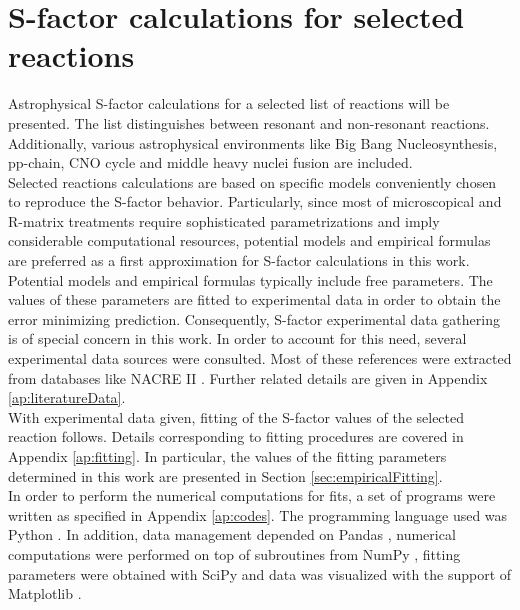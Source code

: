 \documentclass[openany]{book}
\begin{document}
\chapter{S-factor calculations for selected reactions} \label{ch:sfactorCalculations}

Astrophysical S-factor calculations for a selected list of reactions will be presented. The list distinguishes between resonant and non-resonant reactions. Additionally, various astrophysical environments like Big Bang Nucleosynthesis, pp-chain, CNO cycle and middle heavy nuclei fusion are included.  \\

Selected reactions calculations are based on specific models conveniently chosen to reproduce the S-factor behavior. Particularly, since most of microscopical and R-matrix treatments require sophisticated parametrizations and imply considerable computational resources, potential models and empirical formulas are preferred as a first approximation for S-factor calculations in this work.  \\

Potential models and empirical formulas typically include free parameters. The values of these parameters are fitted to experimental data in order to obtain the error minimizing prediction. Consequently, S-factor experimental data gathering is of special concern in this work. In order to account for this need, several experimental data sources were consulted. Most of these references were extracted from databases like NACRE II \cite{xu_takahashi_goriely_arnould_ohta_utsunomiya_2013}. Further related details are given in Appendix \ref{ap:literatureData}. \\ 

With experimental data given, fitting of the S-factor values of the selected reaction follows. Details corresponding to fitting procedures are covered in Appendix \ref{ap:fitting}.  In particular, the values of the fitting parameters determined in this work are presented in Section \ref{sec:empiricalFitting}.  \\

In order to perform the numerical computations for fits, a set of programs were written as specified in Appendix \ref{ap:codes}. The programming language used was Python \cite{rossum_drake_2009}. In addition, data management depended on Pandas \cite{mckinney_2010}, numerical computations were performed on top of subroutines from NumPy  \cite{harris_millman_vanderwalt_gommers_virtanen_cournapeau_wieser_taylor_berg_smith_et_2020}, fitting parameters were obtained with SciPy \cite{virtanen_gommers_oliphant_haberland_reddy_cournapeau_burovski_peterson_weckesser_bright_et_2020} and data was visualized with the support of Matplotlib \cite{hunter_2007}. \\
\end{document}
